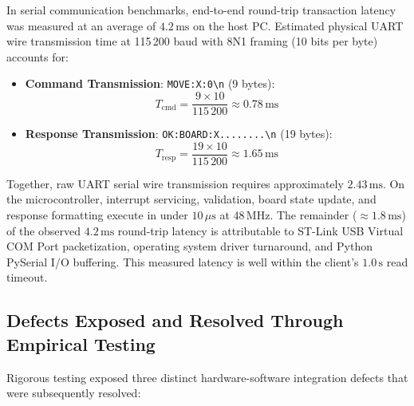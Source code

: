 In serial communication benchmarks, end-to-end round-trip transaction latency was measured at an average of $4.2\,\text{ms}$ on the host PC.
Estimated physical UART wire transmission time at 115\,200 baud with 8N1 framing (10 bits per byte) accounts for:
\begin{itemize}
    \item \textbf{Command Transmission}: \texttt{MOVE:X:0\textbackslash n} (9 bytes):
    \begin{equation}
    T_{\text{cmd}} = \frac{9 \times 10}{115\,200} \approx 0.78\,\text{ms}
    \end{equation}
    \item \textbf{Response Transmission}: \texttt{OK:BOARD:X........\textbackslash n} (19 bytes):
    \begin{equation}
    T_{\text{resp}} = \frac{19 \times 10}{115\,200} \approx 1.65\,\text{ms}
    \end{equation}
\end{itemize}
Together, raw UART serial wire transmission requires approximately $2.43\,\text{ms}$.
On the microcontroller, interrupt servicing, validation, board state update, and response formatting execute in under $10\,\mu\text{s}$ at 48\,MHz.
The remainder ($\approx 1.8\,\text{ms}$) of the observed $4.2\,\text{ms}$ round-trip latency is attributable to ST-Link USB Virtual COM Port packetization, operating system driver turnaround, and Python PySerial I/O buffering.
This measured latency is well within the client's $1.0\,\text{s}$ read timeout.

\subsection{Defects Exposed and Resolved Through Empirical Testing}

Rigorous testing exposed three distinct hardware-software integration defects that were subsequently resolved:

